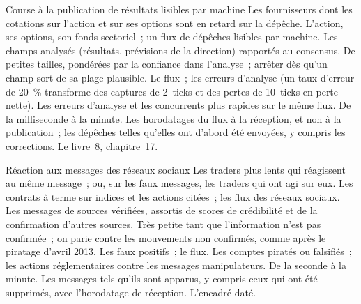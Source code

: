 \begin{strategyfile}{Course à la publication de résultats lisibles par machine}\label{strat:hf:news-and-event-trading:earnings}
 Les fournisseurs dont les cotations sur l'action et sur ses options sont en retard sur la dépêche.
 L'action, ses options, son fonds sectoriel~; un flux de dépêches lisibles par machine.
 Les champs analysés (résultats, prévisions de la direction) rapportés au consensus.
 De petites tailles, pondérées par la confiance dans l'analyse~; arrêter dès qu'un champ sort de sa plage plausible.
 Le flux~; les erreurs d'analyse (un taux d'erreur de 20~\% transforme des captures de 2~ticks et des pertes de 10~ticks en perte nette).
 Les erreurs d'analyse et les concurrents plus rapides sur le même flux.
 De la milliseconde à la minute.
 Les horodatages du flux à la réception, et non à la publication~; les dépêches telles qu'elles ont d'abord été envoyées, y compris les corrections.
 Le livre~8, chapitre~17.
\end{strategyfile}

\begin{strategyfile}{Réaction aux messages des réseaux sociaux}\label{strat:hf:news-and-event-trading:social}
 Les traders plus lents qui réagissent au même message~; ou, sur les faux messages, les traders qui ont agi sur eux.
 Les contrats à terme sur indices et les actions citées~; les flux des réseaux sociaux.
 Les messages de sources vérifiées, assortis de scores de crédibilité et de la confirmation d'autres sources.
 Très petite tant que l'information n'est pas confirmée~; on parie contre les mouvements non confirmés, comme après le piratage d'avril 2013.
 Les faux positifs~; le flux.
 Les comptes piratés ou falsifiés~; les actions réglementaires contre les messages manipulateurs.
 De la seconde à la minute.
 Les messages tels qu'ils sont apparus, y compris ceux qui ont été supprimés, avec l'horodatage de réception.
 L'encadré daté.
\end{strategyfile}

